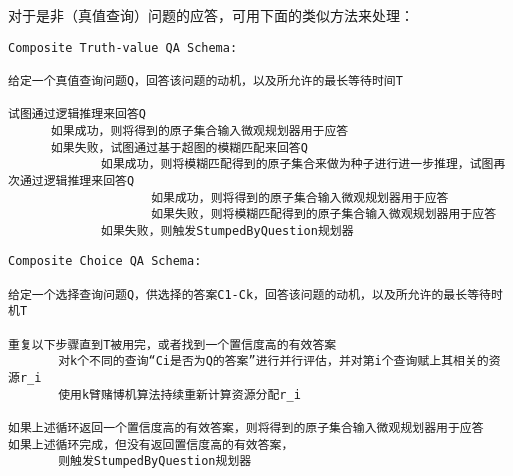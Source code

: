 对于是非（真值查询）问题的应答，可用下面的类似方法来处理：

\begin{verbatim}
Composite Truth-value QA Schema:

给定一个真值查询问题Q，回答该问题的动机，以及所允许的最长等待时间T

试图通过逻辑推理来回答Q
      如果成功，则将得到的原子集合输入微观规划器用于应答
      如果失败，试图通过基于超图的模糊匹配来回答Q
             如果成功，则将模糊匹配得到的原子集合来做为种子进行进一步推理，试图再次通过逻辑推理来回答Q
                    如果成功，则将得到的原子集合输入微观规划器用于应答
                    如果失败，则将模糊匹配得到的原子集合输入微观规划器用于应答
             如果失败，则触发StumpedByQuestion规划器

\end{verbatim}	

\begin{verbatim}
Composite Choice QA Schema:

给定一个选择查询问题Q，供选择的答案C1-Ck，回答该问题的动机，以及所允许的最长等待时机T

重复以下步骤直到T被用完，或者找到一个置信度高的有效答案
       对k个不同的查询“Ci是否为Q的答案”进行并行评估，并对第i个查询赋上其相关的资源r_i
       使用k臂赌博机算法持续重新计算资源分配r_i

如果上述循环返回一个置信度高的有效答案，则将得到的原子集合输入微观规划器用于应答
如果上述循环完成，但没有返回置信度高的有效答案，
       则触发StumpedByQuestion规划器


\end{verbatim}	
			

